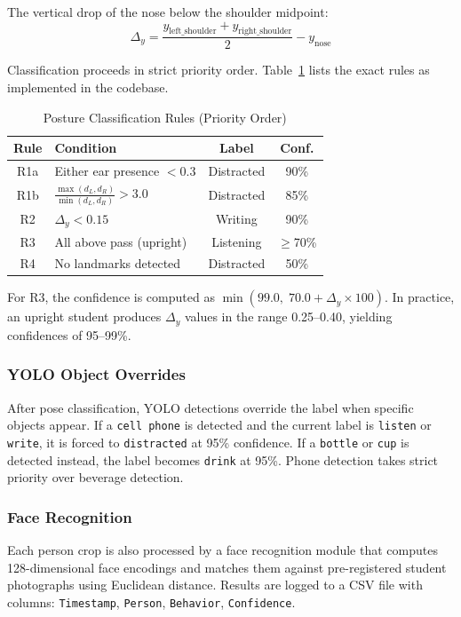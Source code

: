 \documentclass[conference]{IEEEtran}
\begin{document}
The vertical drop of the nose below the shoulder midpoint:
\begin{equation}
\Delta_y = \frac{y_{\text{left\_shoulder}} + y_{\text{right\_shoulder}}}{2} - y_{\text{nose}}
\label{eq:nose_drop}
\end{equation}

Classification proceeds in strict priority order. Table~\ref{tab:rules} lists the exact rules as implemented in the codebase.

\begin{table}[htbp]
\caption{Posture Classification Rules (Priority Order)}
\begin{center}
\begin{tabular}{|c|p{4.0cm}|c|c|}
\hline
\textbf{Rule} & \textbf{Condition} & \textbf{Label} & \textbf{Conf.} \\
\hline
R1a & Either ear presence $< 0.3$ & Distracted & 90\% \\
\hline
R1b & $\frac{\max(d_L, d_R)}{\min(d_L, d_R)} > 3.0$ & Distracted & 85\% \\
\hline
R2 & $\Delta_y < 0.15$ & Writing & 90\% \\
\hline
R3 & All above pass (upright) & Listening & $\geq$70\% \\
\hline
R4 & No landmarks detected & Distracted & 50\% \\
\hline
\end{tabular}
\label{tab:rules}
\end{center}
\end{table}

For R3, the confidence is computed as $\min(99.0,\; 70.0 + \Delta_y \times 100)$. In practice, an upright student produces $\Delta_y$ values in the range 0.25--0.40, yielding confidences of 95--99\%.

\subsubsection{YOLO Object Overrides}
After pose classification, YOLO detections override the label when specific objects appear. If a \texttt{cell phone} is detected and the current label is \texttt{listen} or \texttt{write}, it is forced to \texttt{distracted} at 95\% confidence. If a \texttt{bottle} or \texttt{cup} is detected instead, the label becomes \texttt{drink} at 95\%. Phone detection takes strict priority over beverage detection.

\subsubsection{Face Recognition}
Each person crop is also processed by a face recognition module that computes 128-dimensional face encodings and matches them against pre-registered student photographs using Euclidean distance. Results are logged to a CSV file with columns: \texttt{Timestamp}, \texttt{Person}, \texttt{Behavior}, \texttt{Confidence}.
\end{document}

